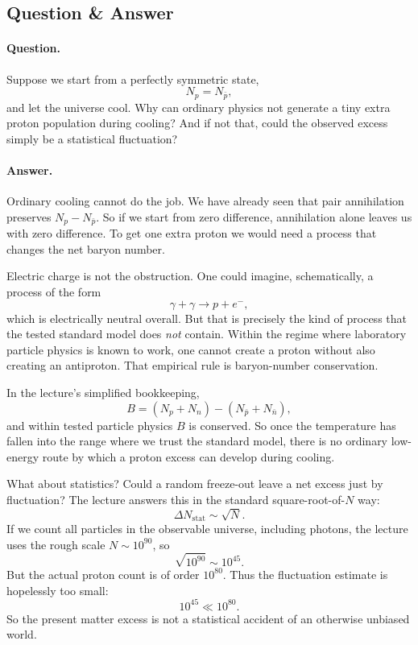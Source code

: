 \subsection{Question \& Answer}

\paragraph{Question.} Suppose we start from a perfectly symmetric state,
\begin{equation}
N_p=N_{\bar p},
\end{equation}
and let the universe cool. Why can ordinary physics not generate a tiny extra proton population during cooling? And if not that, could the observed excess simply be a statistical fluctuation?

\paragraph{Answer.} Ordinary cooling cannot do the job. We have already seen that pair annihilation preserves \(N_p-N_{\bar p}\). So if we start from zero difference, annihilation alone leaves us with zero difference. To get one extra proton we would need a process that changes the net baryon number.

Electric charge is not the obstruction. One could imagine, schematically, a process of the form
\begin{equation}
\gamma+\gamma \to p+e^-,
\end{equation}
which is electrically neutral overall. But that is precisely the kind of process that the tested standard model does \emph{not} contain. Within the regime where laboratory particle physics is known to work, one cannot create a proton without also creating an antiproton. That empirical rule is baryon-number conservation.

In the lecture's simplified bookkeeping,
\begin{equation}
B=(N_p+N_n)-(N_{\bar p}+N_{\bar n}),
\end{equation}
and within tested particle physics \(B\) is conserved. So once the temperature has fallen into the range where we trust the standard model, there is no ordinary low-energy route by which a proton excess can develop during cooling.

What about statistics? Could a random freeze-out leave a net excess just by fluctuation? The lecture answers this in the standard square-root-of-\(N\) way:
\begin{equation}
\Delta N_{\mathrm{stat}}\sim \sqrt{N}.
\end{equation}
If we count all particles in the observable universe, including photons, the lecture uses the rough scale \(N\sim 10^{90}\), so
\begin{equation}
\sqrt{10^{90}}\sim 10^{45}.
\end{equation}
But the actual proton count is of order \(10^{80}\). Thus the fluctuation estimate is hopelessly too small:
\begin{equation}
10^{45}\ll 10^{80}.
\end{equation}
So the present matter excess is not a statistical accident of an otherwise unbiased world.

